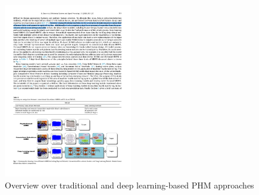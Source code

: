 \begin{figure}[H]
  \centering
  \includegraphics[angle=90, width=0.5\textwidth]{hand_crafted_features_physical_models_deep_learning.pdf}
  \caption {Overview over traditional and deep learning-based PHM approaches \cite{ZHAO2019213}} \label{fig:hand_crafted_features_physical_models_deep_learning}
\end{figure}
